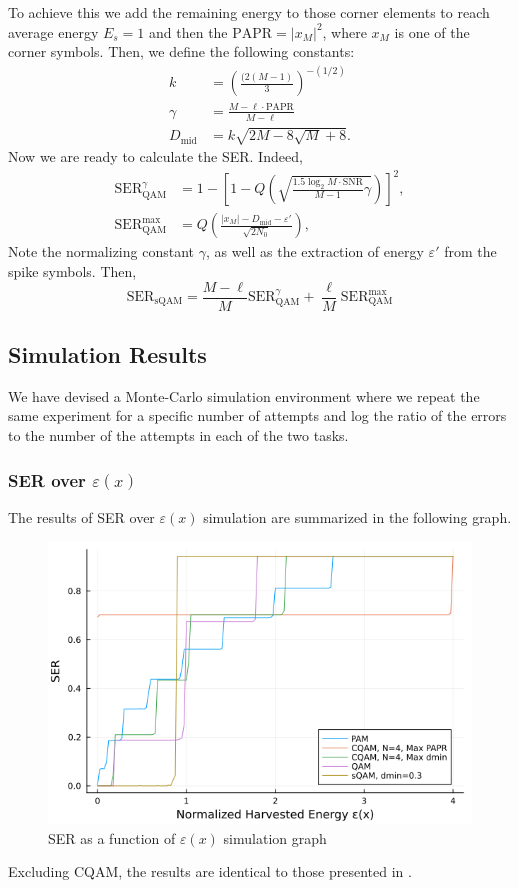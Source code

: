 \documentclass[11pt,a4paper,onecolumn,final]{article}
\newcommand{\eps}{\varepsilon}
\begin{document}
To achieve this we add the remaining energy to those corner elements to reach average energy \(E_s = 1\) and then the \(\text{PAPR} = |x_M|^2\), where \(x_M\) is one of the corner symbols. Then, we define the following constants: 
\begin{align}
    k &= \left(\frac{(2(M - 1)}{3}\right)^{-(1/2)} \\
    \gamma &= \frac{M - \ell \cdot \text{PAPR}}{M - \ell} \\
    D_\text{mid} &= k\sqrt{2M - 8\sqrt{M} + 8}. 
\end{align}
Now we are ready to calculate the SER. Indeed, 
\begin{align}
    \text{SER}_\text{QAM}^\gamma &= 1 - \left[1 - Q\left(\sqrt{\frac{1.5\log_2 M \cdot \text{SNR}}{M - 1}\gamma}\right)\right]^2, \\
    \text{SER}_\text{QAM}^\text{max} &= Q\left(\frac{|x_M| - D_\text{mid} - \eps '}{\sqrt{2N_0}}\right),
\end{align}
Note the normalizing constant \(\gamma \), as well as the extraction of energy \(\eps '\) from the spike symbols. Then, 
\begin{equation}
    \text{SER}_\text{sQAM} = \frac{M - \ell}{M }\text{SER}_\text{QAM}^\gamma + \frac{\ell }{M }\text{SER}_\text{QAM}^\text{max}
\end{equation}

\subsection{Simulation Results}
We have devised a Monte-Carlo simulation environment where we repeat the same experiment for a specific number of attempts and log the ratio of the errors to the number of the attempts in each of the two tasks. 

\subsubsection*{SER over \(\eps(x)\)}
The results of SER over \(\eps(x)\) simulation are summarized in the following graph. 

\begin{figure}[h]
    \centering
    \includegraphics[scale=0.59]{ex2_a.png}
    \caption{SER as a function of \(\eps(x)\) simulation graph}
\end{figure}
Excluding CQAM, the results are identical to those presented in \cite{cqam}. 
\end{document}
